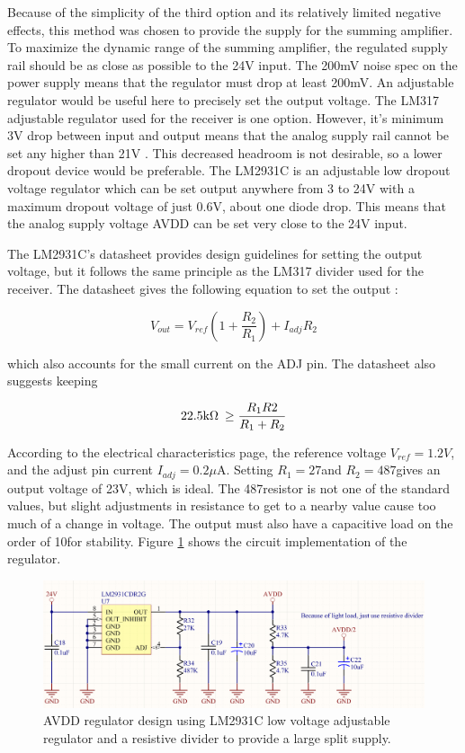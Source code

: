 	Because of the simplicity of the third option and its relatively limited negative effects, this method was chosen to provide the supply for the summing amplifier.  To maximize the dynamic range of the summing amplifier, the regulated supply rail should be as close as possible to the 24V input.  The 200mV noise spec on the power supply means that the regulator must drop at least 200mV.  An adjustable regulator would be useful here to precisely set the output voltage.  The LM317 adjustable regulator used for the receiver is one option.  However, it's minimum 3V drop between input and output means that the analog supply rail cannot be set any higher than 21V \cite{LM317datasheet}.  This decreased headroom is not desirable, so a lower dropout device would be preferable.  The LM2931C is an adjustable low dropout voltage regulator which can be set output anywhere from 3 to 24V with a maximum dropout voltage of just 0.6V, about one diode drop.  This means that the analog supply voltage AVDD can be set very close to the 24V input.

	The LM2931C's datasheet provides design guidelines for setting the output voltage, but it follows the same principle as the LM317 divider used for the receiver.  The datasheet gives the following equation to set the output \cite{LM2931datasheet}:

	$$ V_{out} = V_{ref} \left( 1 + \frac{R_2}{R_1} \right) + I_{adj}R_2 $$

	which also accounts for the small current on the ADJ pin.  The datasheet also suggests keeping

	$$ 22.5\text{k$\Omega$\:} \ge \frac{R_1R2}{R_1 + R_2} $$

	According to the electrical characteristics page, the reference voltage $V_{ref} = 1.2V$, and the adjust pin current $I_{adj} = 0.2\mu$A.  Setting $R_1 = 27$\kohm and $R_2 = 487$\kohm gives an output voltage of 23V, which is ideal.  The 487\kohm resistor is not one of the standard values, but slight adjustments in resistance to get to a nearby value cause too much of a change in voltage.  The output must also have a capacitive load on the order of 10\uF for stability.  Figure \ref{fig:AVDDreg} shows the circuit implementation of the regulator.

	\begin{figure}
		\centering
		\includegraphics[width = \textwidth]{PR4Images/AVDDregulator.PNG}
		\caption{AVDD regulator design using LM2931C low voltage adjustable regulator and a resistive divider to provide a large split supply.}
		\label{fig:AVDDreg}
	\end{figure}

